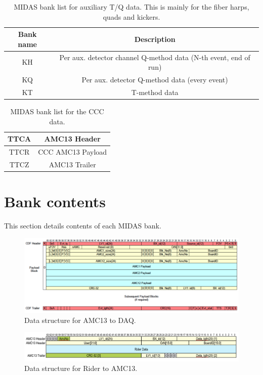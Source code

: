 \begin{table}[htbp]
\centering
\caption{MIDAS bank list for auxiliary T/Q data. This is mainly for the fiber harps, quads and kickers.}
\begin{tabular}{|c|c|}
\hline 
Bank name  & Description \\
\hline
KH &  Per aux. detector channel Q-method data (N-th event, end of run)\\
\hline
KQ &  Per aux. detector Q-method data (every event)\\
\hline
KT & T-method data \\
\hline
\end{tabular} 
\end{table}

\begin{table}[htbp]
\centering
\caption{MIDAS bank list for the CCC data.}
\begin{tabular}{|c|c|}
\hline 
TTCA & AMC13 Header \\
\hline
TTCR & CCC AMC13 Payload\\
\hline
TTCZ & AMC13 Trailer \\
\hline
\end{tabular} 
\end{table}


\section{Bank contents}

This section details contents of each MIDAS bank. 

\begin{figure}[htbp]
\centering
\includegraphics[width=\textwidth]{pics/AMC13ToDAQ.pdf} 
\caption{Data structure for AMC13 to DAQ.}\label{fig:AMC13ToDAQ}
\end{figure}

\begin{figure}[htbp]
\centering
\includegraphics[width=\textwidth]{pics/RiderToAMC13.pdf} 
\caption{Data structure for Rider to AMC13.}\label{fig:RiderToAMC13}
\end{figure}

